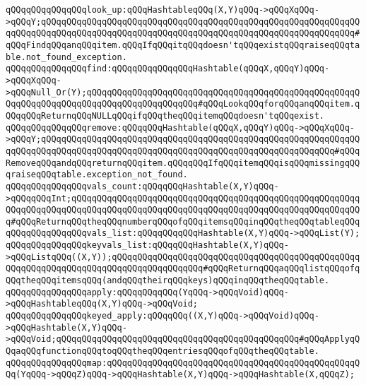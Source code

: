 \newline
\verb|qQQqqQQqqQQqqQQqlook_up:qQQqHashtableqQQq(X,Y)qQQq->qQQqXqQQq->qQQqY;qQQqqQQqqQQqqQQqqQQqqQQqqQQqqQQqqQQqqQQqqQQqqQQqqQQqqQQqqQQqqQQqqQQqqQQqqQQqqQQqqQQqqQQqqQQqqQQqqQQqqQQqqQQqqQQqqQQqqQQqqQQqqQQqqQQq#qQQqFindqQQqanqQQqitem.qQQqIfqQQqitqQQqdoesn'tqQQqexistqQQqraiseqQQqtable.not_found_exception.|\newline
\verb|qQQqqQQqqQQqqQQqfind:qQQqqQQqqQQqqQQqHashtable(qQQqX,qQQqY)qQQq->qQQqXqQQq->qQQqNull_Or(Y);qQQqqQQqqQQqqQQqqQQqqQQqqQQqqQQqqQQqqQQqqQQqqQQqqQQqqQQqqQQqqQQqqQQqqQQqqQQqqQQqqQQqqQQqqQQq#qQQqLookqQQqforqQQqanqQQqitem.qQQqqQQqReturnqQQqNULLqQQqifqQQqtheqQQqitemqQQqdoesn'tqQQqexist.|\newline
\verb|qQQqqQQqqQQqqQQqremove:qQQqqQQqHashtable(qQQqX,qQQqY)qQQq->qQQqXqQQq->qQQqY;qQQqqQQqqQQqqQQqqQQqqQQqqQQqqQQqqQQqqQQqqQQqqQQqqQQqqQQqqQQqqQQqqQQqqQQqqQQqqQQqqQQqqQQqqQQqqQQqqQQqqQQqqQQqqQQqqQQqqQQqqQQqqQQq#qQQqRemoveqQQqandqQQqreturnqQQqitem.qQQqqQQqIfqQQqitemqQQqisqQQqmissingqQQqraiseqQQqtable.exception_not_found.|\newline
\newline
\newline
\verb|qQQqqQQqqQQqqQQqvals_count:qQQqqQQqHashtable(X,Y)qQQq->qQQqqQQqInt;qQQqqQQqqQQqqQQqqQQqqQQqqQQqqQQqqQQqqQQqqQQqqQQqqQQqqQQqqQQqqQQqqQQqqQQqqQQqqQQqqQQqqQQqqQQqqQQqqQQqqQQqqQQqqQQqqQQqqQQqqQQqqQQq#qQQqReturnqQQqtheqQQqnumberqQQqofqQQqitemsqQQqinqQQqtheqQQqtableqQQq|\newline
\newline
\verb|qQQqqQQqqQQqqQQqvals_list:qQQqqQQqqQQqHashtable(X,Y)qQQq->qQQqList(Y);|\newline
\newline
\verb|qQQqqQQqqQQqqQQqkeyvals_list:qQQqqQQqHashtable(X,Y)qQQq->qQQqListqQQq((X,Y));qQQqqQQqqQQqqQQqqQQqqQQqqQQqqQQqqQQqqQQqqQQqqQQqqQQqqQQqqQQqqQQqqQQqqQQqqQQqqQQqqQQqqQQq#qQQqReturnqQQqaqQQqlistqQQqofqQQqtheqQQqitemsqQQq(andqQQqtheirqQQqkeys)qQQqinqQQqtheqQQqtable.|\newline
\newline
\verb|qQQqqQQqqQQqqQQqapply:qQQqqQQqqQQq(YqQQq->qQQqVoid)qQQq->qQQqHashtableqQQq(X,Y)qQQq->qQQqVoid;|\newline
\verb|qQQqqQQqqQQqqQQqkeyed_apply:qQQqqQQq((X,Y)qQQq->qQQqVoid)qQQq->qQQqHashtable(X,Y)qQQq->qQQqVoid;qQQqqQQqqQQqqQQqqQQqqQQqqQQqqQQqqQQqqQQqqQQqqQQq#qQQqApplyqQQqaqQQqfunctionqQQqtoqQQqtheqQQqentriesqQQqofqQQqtheqQQqtable.|\newline
\newline
\verb|qQQqqQQqqQQqqQQqmap:qQQqqQQqqQQqqQQqqQQqqQQqqQQqqQQqqQQqqQQqqQQqqQQqqQQq(YqQQq->qQQqZ)qQQq->qQQqHashtable(X,Y)qQQq->qQQqHashtable(X,qQQqZ);|\newline
